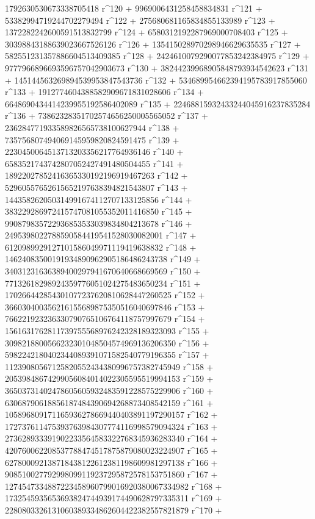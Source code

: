        1792630530673338705418 r^120 + 9969006431258458834831 r^121 + 
       53382994719244702279494 r^122 + 
       275680681165834855133989 r^123 + 
       1372282242600591513832799 r^124 + 
       6580312192287969000708403 r^125 + 
       30398843188639023667526126 r^126 + 
       135415028970298946629635535 r^127 + 
       582551231357886604513409385 r^128 + 
       2424610079290077853242384975 r^129 + 
       9777966896693596757042903673 r^130 + 
       38244239968905848793934542623 r^131 + 
       145144563269894539953847543736 r^132 + 
       534689954662394195783917855060 r^133 + 
       1912774604388582909671831028606 r^134 + 
       6648690434414239955192586402089 r^135 + 
       22468815932433244045916237835284 r^136 + 
       73862328351702574656250005565052 r^137 + 
       236284771933589826565738100627944 r^138 + 
       735756807494069145959820824591475 r^139 + 
       2230450064513713203356217764936146 r^140 + 
       6583521743742807052427491480504455 r^141 + 
       18922027852416365330192196919467263 r^142 + 
       52960557652615652197638394821543807 r^143 + 
       144358262050314991674112707133125856 r^144 + 
       383229286972415747081055352011416850 r^145 + 
       990879835722936853533039834804213678 r^146 + 
       2495398022788590584419541528030082001 r^147 + 
       6120989929127101586049971119419638832 r^148 + 
       14624083500191934890962905186486243738 r^149 + 
       34031231636389400297941670640668669569 r^150 + 
       77132618298924359776051024275483650234 r^151 + 
       170266442854301077237620810628447260525 r^152 + 
       366030400356216155689875350516040697846 r^153 + 
       766221923236330790765106764118757997679 r^154 + 
       1561631762811739755568976242328189323093 r^155 + 
       3098218800566232301048504574969136206350 r^156 + 
       5982242180402344089391071582540779196355 r^157 + 
       11239080567125820552434380996757382745949 r^158 + 
       20539848674299056084014022305595519994153 r^159 + 
       36503731402478605605932483591228575229906 r^160 + 
       63068790618856187484390694268873408542159 r^161 + 
       105896809171165936278669440403891197290157 r^162 + 
       172737611475393763984307774116998579094324 r^163 + 
       273628933391902233564583322768345936283340 r^164 + 
       420760062208537788474517875879080023224907 r^165 + 
       627800092138718438122612381198609981297138 r^166 + 
       908510027792998099119237295872578153751860 r^167 + 
       1274547334887223458960799016920380067334982 r^168 + 
       1732545935653693824744939174490628797335311 r^169 + 
       2280803326131060389334862604422382557821879 r^170 + 
